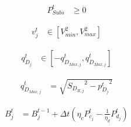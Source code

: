\documentclass[../../outputs/main.tex]{subfiles}
\begin{document}
\vspace{-2.0em} %

\begin{align}
    {P^t_{Subs}} &\geq {0} \label{eq:substationRealPowerLimits}
\end{align}

\vspace{-2.0em} %

\begin{align}
    { v^{t}_{j} } &\in { \left[ V^{2}_{min}, V^{2}_{max} \right]} \label{eq:lim_vj}
\end{align}

\vspace{-1.5em} %


\begin{align}
    { q^{t}_{D_{j}} } 
    &\in
    { \left[-q_{D_{Max, j}}^{t}, q_{D_{Max, j}}^{t}\right] } \label{eq:pv-inverter-reactive-power-limits-1ph}
\end{align}

\vspace{-1.5em} %

\begin{align}
    q_{D_{Max, j}}^{t} &= \sqrt{ {S_{D_{R, j}}}^2 - {p^{t}_{D_{j}}}^2} 
    \label{eq:pv-inverter-reactive-power-maximum-1ph}
\end{align}

\vspace{-1.5em} %


\begin{align}
    {B_{j}^{t}} &= {B_{j}^{t-1} + \Delta t \left( \eta_c P_{c_j}^t - \frac{1}{\eta_d} P_{d_j}^t \right)  }
    \label{eq:SOC-Trajectory-j}
\end{align}
\vspace{-2.0em} %
\end{document}

